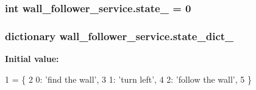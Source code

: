 \subsubsection[{\texorpdfstring{state\+\_\+}{state_}}]{\setlength{\rightskip}{0pt plus 5cm}int wall\+\_\+follower\+\_\+service.\+state\+\_\+ = 0}\hypertarget{namespacewall__follower__service_a85ced827917bea830636e97f3c2e737c}{}\label{namespacewall__follower__service_a85ced827917bea830636e97f3c2e737c}
\subsubsection[{\texorpdfstring{state\+\_\+dict\+\_\+}{state_dict_}}]{\setlength{\rightskip}{0pt plus 5cm}dictionary wall\+\_\+follower\+\_\+service.\+state\+\_\+dict\+\_\+}\hypertarget{namespacewall__follower__service_ad1235d309f9ac4c61a2c58c70b7e4895}{}\label{namespacewall__follower__service_ad1235d309f9ac4c61a2c58c70b7e4895}
{\bfseries Initial value\+:}
\begin{DoxyCode}
1 = \{
2     0: \textcolor{stringliteral}{'find the wall'},
3     1: \textcolor{stringliteral}{'turn left'},
4     2: \textcolor{stringliteral}{'follow the wall'},
5 \}
\end{DoxyCode}
